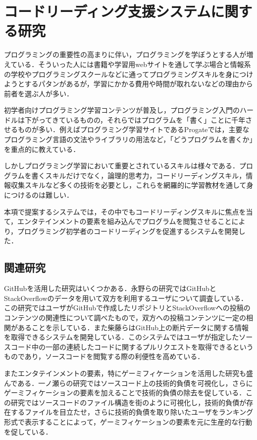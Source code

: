 \section{コードリーディング支援システムに関する研究}

プログラミングの重要性の高まりに伴い，プログラミングを学ぼうとする人が増えている．そういった人には書籍や学習用webサイトを通して学ぶ場合と情報系の学校やプログラミングスクールなどに通ってプログラミングスキルを身につけようとするパタンがあるが，学習にかかる費用や時間が取れないなどの理由から前者を選ぶ人が多い．

初学者向けプログラミング学習コンテンツが普及し，プログラミング入門のハードルは下がってきているものの，それらではプログラムを「書く」ことに千年させるものが多い．例えばプログラミング学習サイトであるProgate\cite{progate}では，主要なプログラミング言語の文法やライブラリの用法など，「どうプログラムを書くか」を重点的に教えている．

しかしプログラミング学習において重要とされているスキルは様々である．プログラムを書くスキルだけでなく，論理的思考力，コードリーディングスキル，情報収集スキルなど多くの技術を必要とし，これらを網羅的に学習教材を通して身につけるのは難しい．

本項で提案するシステムでは，その中でもコードリーディングスキルに焦点を当て，エンタテインメントの要素を組み込んでプログラムを閲覧させることにより，プログラミング初学者のコードリーディングを促進するシステムを開発した．
\subsection{関連研究}

GitHubを活用した研究はいくつかある．永野らの研究\cite{nagano}ではGitHubとStackOverflowのデータを用いて双方を利用するユーザについて調査している．この研究ではユーザがGitHubで作成したリポジトリとStackOverflowへの投稿のコンテンツの関連性について調べたもので，双方への投稿コンテンツに一定の相関があることを示している．また柴藤らはGitHub上の断片データに関する情報を取得できるシステムを開発している\cite{shibatou}．このシステムではユーザが指定したソースコード中の一部の連続したコードに関するプルリクエストを取得できるというものであり，ソースコードを閲覧する際の利便性を高めている．

またエンタテインメントの要素，特にゲーミフィケーションを活用した研究も盛んである．一ノ瀬らの研究\cite{ichinose}ではソースコード上の技術的負債を可視化し，さらにゲーミフィケーションの要素を加えることで技術的負債の除去を促している．この研究ではソースコードのファイル構造を街のように可視化し，技術的負債が存在するファイルを目立たせ，さらに技術的負債を取り除いたユーザをランキング形式で表示することによって，ゲーミフィケーションの要素を元に生産的な行動を促している．

